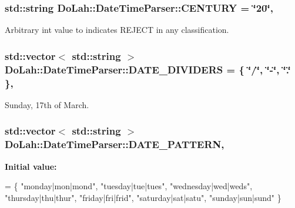 \subsubsection[{C\+E\+N\+T\+U\+R\+Y}]{\setlength{\rightskip}{0pt plus 5cm}std\+::string Do\+Lah\+::\+Date\+Time\+Parser\+::\+C\+E\+N\+T\+U\+R\+Y = \char`\"{}20\char`\"{}\hspace{0.3cm}{\ttfamily [static]}, {\ttfamily [private]}}\label{class_do_lah_1_1_date_time_parser_adb080e964894e09a85f4b5314e4098d7}


Arbitrary int value to indicates R\+E\+J\+E\+C\+T in any classification. 

\hypertarget{class_do_lah_1_1_date_time_parser_a3f39609d7434c47c257dc17045d1913a}{}
\subsubsection[{D\+A\+T\+E\+\_\+\+D\+I\+V\+I\+D\+E\+R\+S}]{\setlength{\rightskip}{0pt plus 5cm}std\+::vector$<$ std\+::string $>$ Do\+Lah\+::\+Date\+Time\+Parser\+::\+D\+A\+T\+E\+\_\+\+D\+I\+V\+I\+D\+E\+R\+S = \{ \char`\"{}/\char`\"{}, \char`\"{}-\/\char`\"{}, \char`\"{}.\char`\"{} \}\hspace{0.3cm}{\ttfamily [static]}, {\ttfamily [private]}}\label{class_do_lah_1_1_date_time_parser_a3f39609d7434c47c257dc17045d1913a}


Sunday, 17th of March. 

\hypertarget{class_do_lah_1_1_date_time_parser_a315041bae4546ac4d88ba9ed955edceb}{}
\subsubsection[{D\+A\+T\+E\+\_\+\+P\+A\+T\+T\+E\+R\+N}]{\setlength{\rightskip}{0pt plus 5cm}std\+::vector$<$ std\+::string $>$ Do\+Lah\+::\+Date\+Time\+Parser\+::\+D\+A\+T\+E\+\_\+\+P\+A\+T\+T\+E\+R\+N\hspace{0.3cm}{\ttfamily [static]}, {\ttfamily [private]}}\label{class_do_lah_1_1_date_time_parser_a315041bae4546ac4d88ba9ed955edceb}
{\bfseries Initial value\+:}
\begin{DoxyCode}
= \{
        \textcolor{stringliteral}{"monday|mon|mond"},
        \textcolor{stringliteral}{"tuesday|tue|tues"},
        \textcolor{stringliteral}{"wednesday|wed|weds"},
        \textcolor{stringliteral}{"thursday|thu|thur"},
        \textcolor{stringliteral}{"friday|fri|frid"},
        \textcolor{stringliteral}{"saturday|sat|satu"},
        \textcolor{stringliteral}{"sunday|sun|sund"}
    \}
\end{DoxyCode}



